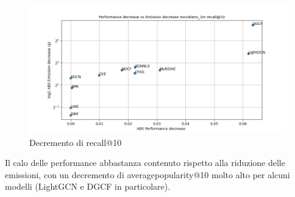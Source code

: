 \begin{figure}[H]
    \centering
     \includegraphics[width=\textwidth]{images/decrement_recall@10_movielens_1m_40_5.png}
    \caption{Decremento di recall@10}
\end{figure}
\noindent Il calo delle performance abbastanza contenuto rispetto alla riduzione delle emissioni, con un decremento di averagepopularity@10 molto alto per alcuni modelli (LightGCN e DGCF in particolare).

